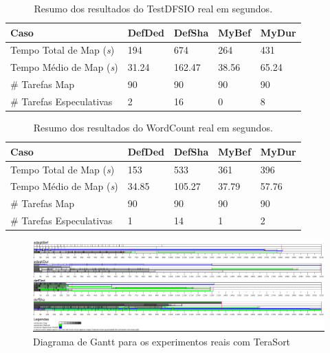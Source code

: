 \begin{table}[h!]
	\caption{Resumo dos resultados do TestDFSIO real em segundos.} \label{tab:exp2IO}
	\begin{tabular*}{\hsize}{lllll} %
		\textbf{Caso} & \textbf{DefDed} & \textbf{DefSha} & \textbf{MyBef} & \textbf{MyDur}\\
		\hline
		Tempo Total de Map ({\it{s}}) & 194 & 674 & 264 & 431 \\
		Tempo Médio de Map ({\it{s}}) & 31.24 & 162.47 & 38.56 &  65.24 \\
		\# Tarefas Map & 90 & 90 & 90 & 90 \\
		\# Tarefas Especulativas & 2 & 16 & 0 & 8 \\
	\end{tabular*}
\end{table}


\begin{table}[h!]
	\caption{Resumo dos resultados do WordCount real em segundos.} \label{tab:exp2WC}
	\begin{tabular*}{\hsize}{lllll} %
		\textbf{Caso} & \textbf{DefDed} & \textbf{DefSha} & \textbf{MyBef} & \textbf{MyDur}\\
		\hline
		Tempo Total de Map ({\it{s}}) & 153 & 533 & 361 & 396 \\
		Tempo Médio de Map ({\it{s}}) & 34.85 & 105.27 & 37.79 & 57.76 \\
		\# Tarefas Map & 90 & 90 & 90 & 90 \\
		\# Tarefas Especulativas & 1 & 14 & 1 & 2 \\
	\end{tabular*}
\end{table}

\begin{figure}[!ht]
	\centering
	\includegraphics[width=1\textwidth]{figuras/TS-real.png}
	\caption{Diagrama de Gantt para os experimentos reais com TeraSort}
	\label{fig:exp2TS}
\end{figure}

